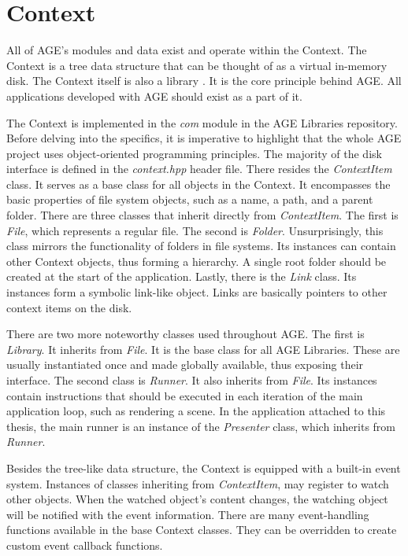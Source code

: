 \documentclass[
  digital,     %
  oneside,     %
  nosansbold,  %
  nocolorbold, %
  lof,         %
  lot,         %
]{fithesis4}
\begin{document}
\section{Context}
All of AGE's modules and data exist and operate within the Context.
The Context is a tree data structure that can be thought of as a virtual in-memory disk.
The Context itself is also a library \cite{age-app-template-readme}.
It is the core principle behind AGE. All applications developed with AGE should
exist as a part of it.

The Context is implemented in the \textit{com} module in the AGE Libraries repository.
Before delving into the specifics, it is imperative to highlight that the whole AGE project
uses object-oriented programming principles. The majority
of the disk interface is defined in the \textit{context.hpp} header file. There resides the \textit{ContextItem}
class. It serves as a base class for all objects in the Context. It encompasses the basic
properties of file system objects, such as a name, a path, and a parent folder. There are three classes
that inherit directly from \textit{ContextItem}. The first is \textit{File}, which represents a regular
file. The second is \textit{Folder}. Unsurprisingly, this class mirrors the functionality of folders
in file systems. Its instances can contain other Context objects, thus forming a hierarchy.
A single root folder should be created at the start of the application. Lastly, there is the \textit{Link}
class. Its instances form a symbolic link-like object. Links are basically pointers to other context items
on the disk.

There are two more noteworthy classes used throughout AGE. The first is \textit{Library}. It inherits from
\textit{File}. It is the base class for all AGE Libraries. These are usually instantiated once
and made globally available, thus exposing their interface. The second class is \textit{Runner}. It also
inherits from \textit{File}. Its instances contain instructions that should be executed
in each iteration of the main application loop, such as rendering a scene. In the application
attached to this thesis, the main runner is an instance of the \textit{Presenter} class,
which inherits from \textit{Runner}.

Besides the tree-like data structure, the Context is equipped with a built-in event system.
Instances of classes inheriting from \textit{ContextItem},
may register to watch other objects. When the watched object's content changes, the
watching object will be notified with the event information. There are many event-handling
functions available in the base Context classes. They can be overridden
to create custom event callback functions.
\end{document}
